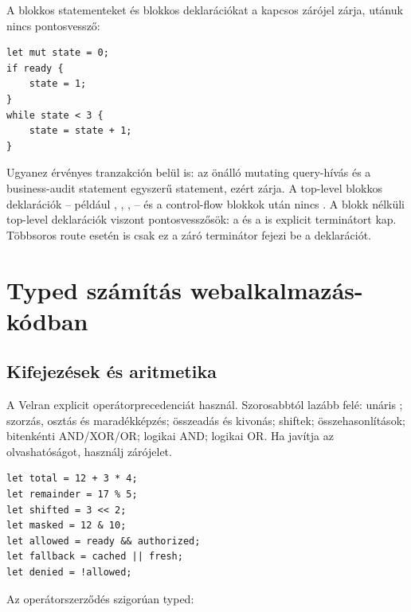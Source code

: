 A blokkos statementeket és blokkos deklarációkat a kapcsos zárójel zárja, utánuk nincs pontosvessző:

\begin{lstlisting}[language=Velran]
let mut state = 0;
if ready {
    state = 1;
}
while state < 3 {
    state = state + 1;
}
\end{lstlisting}

Ugyanez érvényes tranzakción belül is: az önálló mutating query-hívás és a business-audit statement egyszerű statement, ezért \code{;} zárja. A top-level blokkos deklarációk -- például , , ,  -- és a control-flow blokkok után nincs \code{;}. A blokk nélküli top-level deklarációk viszont pontosvesszősök: a  és a  is explicit \code{;} terminátort kap. Többsoros route esetén is csak ez a záró terminátor fejezi be a deklarációt.

\section{Typed számítás webalkalmazás-kódban}

\subsection*{Kifejezések és aritmetika}

A Velran explicit operátorprecedenciát használ. Szorosabbtól lazább felé: unáris \code{!}; szorzás, osztás és maradékképzés; összeadás és kivonás; shiftek; összehasonlítások; bitenkénti AND/XOR/OR; logikai AND; logikai OR. Ha javítja az olvashatóságot, használj zárójelet.

\begin{lstlisting}[language=Velran]
let total = 12 + 3 * 4;
let remainder = 17 % 5;
let shifted = 3 << 2;
let masked = 12 & 10;
let allowed = ready && authorized;
let fallback = cached || fresh;
let denied = !allowed;
\end{lstlisting}

Az operátorszerződés szigorúan typed:

